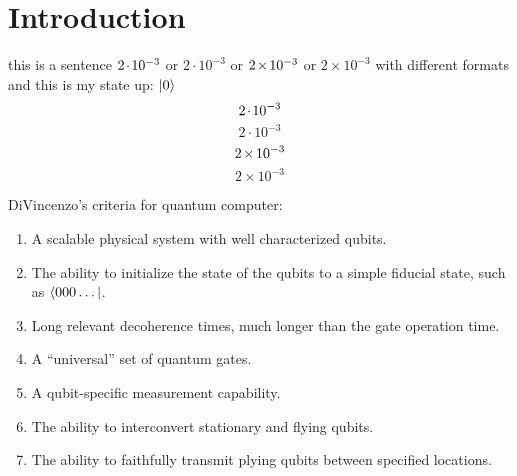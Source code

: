 \chapter{Introduction}
\label{ch:introduction}


this is a sentence $2\mspace{-2mu}\cdot\mspace{-2mu}10^{-3}$ or $2\cdot10^{-3}$ or $2\mspace{-2mu}\times\mspace{-2mu}10^{-3}$ or $2\times10^{-3}$ with different formats and this is my state up: $|0\rangle$\\


$$2\mspace{-2mu}\cdot\mspace{-2mu}10^{-3}$$
$$2\cdot10^{-3}$$
$$2\mspace{-2mu}\times\mspace{-2mu}10^{-3}$$
$$2\times10^{-3}$$


\newpage
DiVincenzo's criteria for quantum computer\cite{DiVincenzo2000}:
\begin{enumerate}
  \item A scalable physical system with well characterized qubits.
  \item The ability to initialize the state of the qubits to a simple fiducial state, such as $\langle000\dots|$.
  \item Long relevant decoherence times, much longer than the gate operation time.
  \item A ``universal'' set of quantum gates.
  \item A qubit-specific measurement capability.
  \item The ability to interconvert stationary and flying qubits.
  \item The ability to faithfully transmit plying qubits between specified locations.
\end{enumerate}
